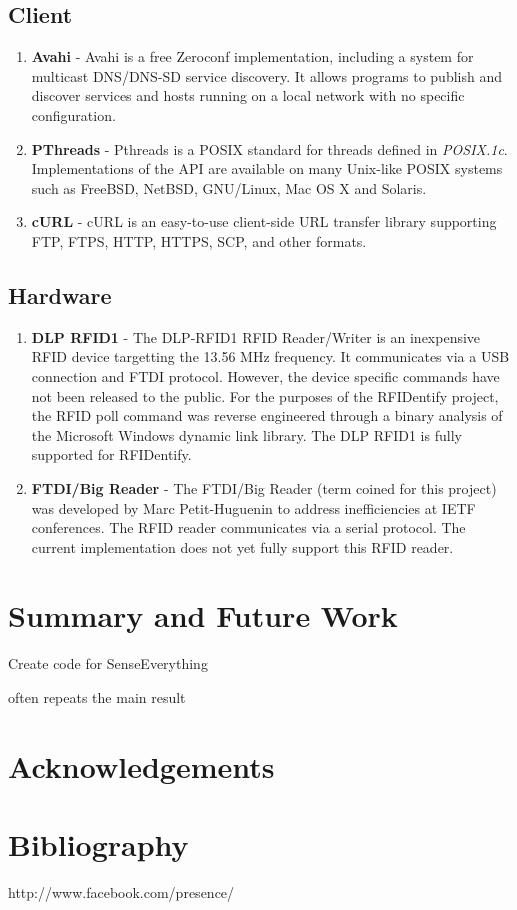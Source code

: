 \documentclass{article}
\begin{document}
	\subsection{Client}
	\begin{enumerate}
		\item	\textbf { Avahi } -
                  Avahi is a free Zeroconf implementation, including a system for multicast DNS/DNS-SD service discovery.
                  It allows programs to publish and discover services and hosts running on a local network 
                  with no specific configuration.

		\item	\textbf { PThreads } -
                  Pthreads is a POSIX standard for threads defined in \textit{POSIX.1c}. 
                  Implementations of the API are available on many Unix-like POSIX systems such as 
                  FreeBSD, NetBSD, GNU/Linux, Mac OS X and Solaris.

		\item	\textbf { cURL } -
                  cURL is an easy-to-use client-side URL transfer library supporting 
                  FTP, FTPS, HTTP, HTTPS, SCP, and other formats.
	\end{enumerate}

	\subsection{Hardware}
	\begin{enumerate}
		\item  { \bf DLP RFID1} -
                  The DLP-RFID1 RFID Reader/Writer is an inexpensive RFID device targetting the 13.56 MHz frequency.
                  It communicates via a USB connection and FTDI protocol. However, the device specific commands
                  have not been released to the public.  For the purposes of the RFIDentify project, the RFID poll
                  command was reverse engineered through a binary analysis of the Microsoft Windows dynamic link library.
                  The DLP RFID1 is fully supported for RFIDentify.

		\item  { \bf FTDI/Big Reader } -
                  The FTDI/Big Reader (term coined for this project) was developed by 
                  Marc Petit-Huguenin to address inefficiencies at IETF conferences.  The RFID
                  reader communicates via a serial protocol. The current implementation does
                  not yet fully support this RFID reader.
	\end{enumerate}
		

	
\section{Summary and Future Work}
Create code for SenseEverything 

	often repeats the main result 
\section{Acknowledgements}
\section{Bibliography} 
	http://www.facebook.com/presence/
\end{document}
